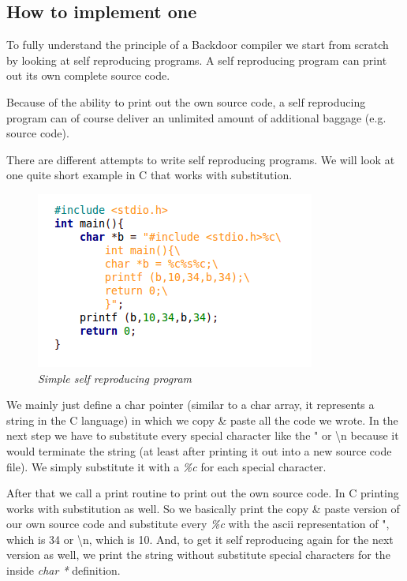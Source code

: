 \documentclass[a4paper, 12pt]{article}
\begin{document}
\newpage

\subsection{How to implement one}

To fully understand the principle of a Backdoor compiler we start from scratch by looking at self reproducing programs. A self reproducing program can print out its own complete source code. 

Because of the ability to print out the own source code, a self reproducing program can of course deliver an unlimited amount of additional baggage (e.g. source code).

There are different attempts to write self reproducing programs. We will look at one quite short example in C that works with substitution.

\begin{figure}[h]
\begin{center}
\includegraphics[keepaspectratio=true, scale=0.8]{Simple_Self_Reproducing.png}
\end{center}
\caption{\emph{Simple self reproducing program}}
\end{figure}

We mainly just define a char pointer (similar to a char array, it represents a string in the C language) in which we copy \& paste all the code we wrote. In the next step we have to substitute every special character like the " or \textbackslash n because it would terminate the string (at least after printing it out into a new source code file). We simply substitute it with a \emph{\%c} for each special character. 

After that we call a print routine to print out the own source code. In C printing works with substitution as well. So we basically print the copy \& paste version of our own source code and substitute every \emph{\%c} with the ascii representation of ", which is 34 or \textbackslash n, which is 10. And, to get it self reproducing again for the next version as well, we print the string without substitute special characters for the inside \emph{char *} definition.
\end{document}
